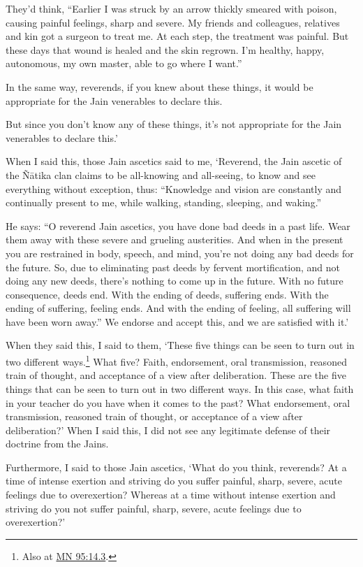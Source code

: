 \documentclass[12pt,openany]{book}%
\begin{document}
They’d think, “Earlier I was struck by an arrow thickly smeared with poison, causing painful feelings, sharp and severe. My friends and colleagues, relatives and kin got a surgeon to treat me. At each step, the treatment was painful. But these days that wound is healed and the skin regrown. I’m healthy, happy, autonomous, my own master, able to go where I want.” 

In the same way, reverends, if you knew about these things, it would be appropriate for the Jain venerables to declare this. 

But since you don’t know any of these things, it’s not appropriate for the Jain venerables to declare this.’ 

When I said this, those Jain ascetics said to me, ‘Reverend, the Jain ascetic of the \textsanskrit{Ñātika} clan claims to be all-knowing and all-seeing, to know and see everything without exception, thus: “Knowledge and vision are constantly and continually present to me, while walking, standing, sleeping, and waking.” 

He says: “O reverend Jain ascetics, you have done bad deeds in a past life. Wear them away with these severe and grueling austerities. And when in the present you are restrained in body, speech, and mind, you’re not doing any bad deeds for the future. So, due to eliminating past deeds by fervent mortification, and not doing any new deeds, there’s nothing to come up in the future. With no future consequence, deeds end. With the ending of deeds, suffering ends. With the ending of suffering, feeling ends. And with the ending of feeling, all suffering will have been worn away.” We endorse and accept this, and we are satisfied with it.’ 

When they said this, I said to them, ‘These five things can be seen to turn out in two different ways.\footnote{Also at \href{https://suttacentral.net/mn95/en/sujato\#14.3}{MN 95:14.3}. } What five? Faith, endorsement, oral transmission, reasoned train of thought, and acceptance of a view after deliberation. These are the five things that can be seen to turn out in two different ways. In this case, what faith in your teacher do you have when it comes to the past? What endorsement, oral transmission, reasoned train of thought, or acceptance of a view after deliberation?’ When I said this, I did not see any legitimate defense of their doctrine from the Jains. 

Furthermore, I said to those Jain ascetics, ‘What do you think, reverends? At a time of intense exertion and striving do you suffer painful, sharp, severe, acute feelings due to overexertion? Whereas at a time without intense exertion and striving do you not suffer painful, sharp, severe, acute feelings due to overexertion?’ 
\end{document}
